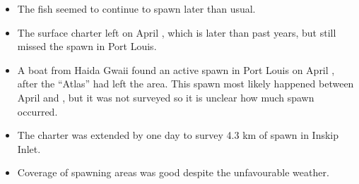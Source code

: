 \begin{itemize}
\item The fish seemed to continue to spawn later than usual.
\item The surface charter left on April , which is later than past years, but still missed the spawn in Port Louis.
\item A boat from Haida Gwaii found an active spawn in Port Louis on April , after the ``Atlas'' had left the area.
This spawn most likely happened between April  and , but it was not surveyed so it is unclear how much spawn occurred.
\item The charter was extended by one day to survey 4.3 km of spawn in Inskip Inlet.
\item Coverage of spawning areas was good despite the unfavourable weather.
\end{itemize}